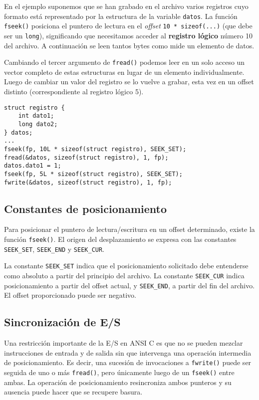 \begin{ejemplo}
En el ejemplo suponemos que se han grabado en el archivo varios registros cuyo
formato está representado por la estructura de la variable \lstinline{datos}. La función
\lstinline{fseek()} posiciona el puntero de lectura en el \textit{offset} \lstinline{10 * sizeof(...)} (que debe
ser un \lstinline{long}), significando que necesitamos acceder al \textbf{registro lógico} número 10 del
archivo. A continuación se leen tantos bytes como mide un elemento de datos.

Cambiando el tercer argumento de \lstinline{fread()} podemos leer en un solo acceso un
vector completo de estas estructuras en lugar de un elemento individualmente.
Luego de cambiar un valor del registro se lo vuelve a grabar, esta vez en un
offset distinto (correspondiente al registro lógico 5).
\begin{lstlisting}
struct registro {
    int dato1;
    long dato2;
} datos;
...
fseek(fp, 10L * sizeof(struct registro), SEEK_SET);
fread(&datos, sizeof(struct registro), 1, fp);
datos.dato1 = 1;
fseek(fp, 5L * sizeof(struct registro), SEEK_SET);
fwrite(&datos, sizeof(struct registro), 1, fp);
\end{lstlisting}
\end{ejemplo}

\subsection{Constantes de posicionamiento}
\label{subsubsec:posicionamiento}
Para posicionar el puntero de lectura/escritura en un offset determinado,
existe la función \lstinline{fseek()}. El origen del desplazamiento se expresa 
con las constantes \lstinline{SEEK_SET}, \lstinline{SEEK_END} y \lstinline{SEEK_CUR}.

La constante \lstinline{SEEK_SET} indica que el posicionamiento solicitado debe entenderse
como absoluto a partir del principio del archivo. La constante \lstinline{SEEK_CUR}
indica posicionamiento a partir del offset actual, y \lstinline{SEEK_END}, a partir del fin del
archivo. El offset proporcionado puede ser negativo.

\subsection{Sincronización de E/S}
Una restricción importante de la E/S en ANSI C es que no se pueden mezclar
instrucciones de entrada y de salida sin que intervenga una operación
intermedia de posicionamiento. Es decir, una sucesión de invocaciones a \lstinline{fwrite()} 
puede ser seguida de uno o más \lstinline{fread()}, pero únicamente luego de un \lstinline{fseek()}
entre ambas. La operación de posicionamiento resincroniza ambos punteros y su
ausencia puede hacer que se recupere basura.

